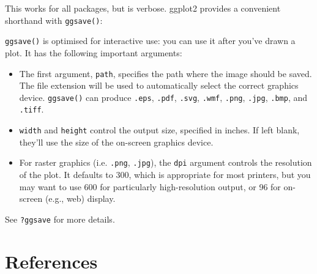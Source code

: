 \begin{Shaded}
\begin{Highlighting}[]
\NormalTok{(}\NormalTok{, } \NormalTok{, } \NormalTok{)}
\StringTok{ }\NormalTok{()}
\NormalTok{()}
\end{Highlighting}
\end{Shaded}

This works for all packages, but is verbose. ggplot2 provides a
convenient shorthand with \texttt{ggsave()}:

\begin{Shaded}
\begin{Highlighting}[]
\StringTok{ }\NormalTok{()}
\NormalTok{(}\NormalTok{)}
\end{Highlighting}
\end{Shaded}

\texttt{ggsave()} is optimised for interactive use: you can use it after
you've drawn a plot. It has the following important arguments:

\begin{itemize}
\item
  The first argument, \texttt{path}, specifies the path where the image
  should be saved. The file extension will be used to automatically
  select the correct graphics device. \texttt{ggsave()} can produce
  \texttt{.eps}, \texttt{.pdf}, \texttt{.svg}, \texttt{.wmf},
  \texttt{.png}, \texttt{.jpg}, \texttt{.bmp}, and \texttt{.tiff}.
\item
  \texttt{width} and \texttt{height} control the output size, specified
  in inches. If left blank, they'll use the size of the on-screen
  graphics device.
\item
  For raster graphics (i.e. \texttt{.png}, \texttt{.jpg}), the
  \texttt{dpi} argument controls the resolution of the plot. It defaults
  to 300, which is appropriate for most printers, but you may want to
  use 600 for particularly high-resolution output, or 96 for on-screen
  (e.g., web) display.
\end{itemize}

See \texttt{?ggsave} for more details.

\section*{References}

